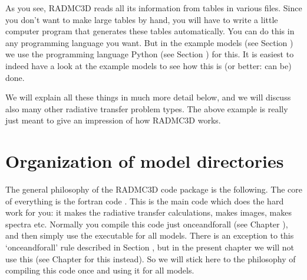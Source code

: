 \documentclass[letterpaper,10pt,english]{sphinxmanual}
\begin{document}
As you see, RADMC\sphinxhyphen{}3D reads all its information from tables in various
files. Since you don’t want to make large tables by hand, you will have to write
a little computer program that generates these tables automatically.  You can do
this in any programming language you want. But in the example models (see
Section {\hyperref[\detokenize{basicstructure:sec-example-models}]{}}) we use the programming language Python (see
Section {\hyperref[\detokenize{overview:sec-requirements}]{}}) for this. It is easiest to indeed have a look
at the example models to see how this is (or better: can be) done.

We will explain all these things in much more detail below, and we will discuss
also many other radiative transfer problem types. The above example is really
just meant to give an impression of how RADMC\sphinxhyphen{}3D works.


\section{Organization of model directories}
\label{\detokenize{basicstructure:organization-of-model-directories}}\label{\detokenize{basicstructure:sec-rough-overview-models}}
The general philosophy of the RADMC\sphinxhyphen{}3D code package is the following. The core
of everything is the fortran code . This is the main code which does
the hard work for you: it makes the radiative transfer calculations, makes
images, makes spectra etc. Normally you compile this code just once\sphinxhyphen{}and\sphinxhyphen{}for\sphinxhyphen{}all
(see Chapter {\hyperref[\detokenize{installation:chap-compilation}]{}}), and then simply use the executable
 for all models. There is an exception to this ‘once\sphinxhyphen{}and\sphinxhyphen{}for\sphinxhyphen{}all’
rule described in Section {\hyperref[\detokenize{installation:sec-special-purpose-compile}]{}}, but in the present
chapter we will not use this (see Chapter {\hyperref[\detokenize{internalsetup:chap-internal-setup}]{}} for this
instead). So we will stick here to the philosophy of compiling this code once
and using it for all models.
\end{document}
